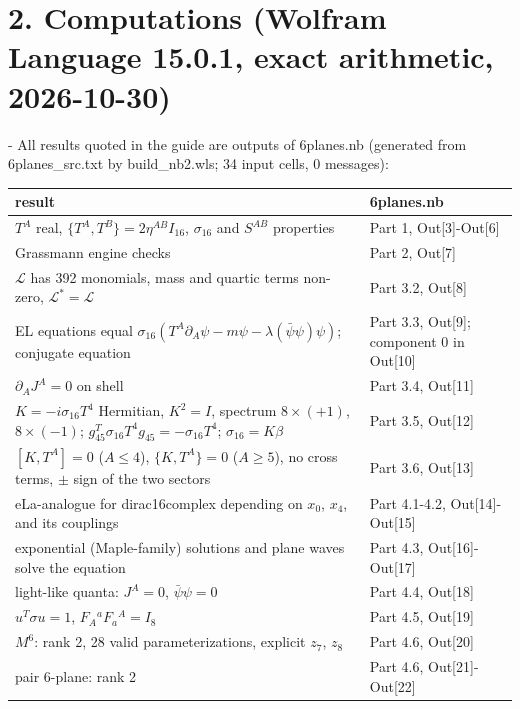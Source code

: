 \documentclass[10pt]{article}
\makeatletter
\newcommand\keepnext{\par\nopagebreak\@nobreaktrue\everypar{\@nobreakfalse\everypar{}}}
\newcommand\mdneed[1]{\par\if@nobreak\else\begingroup\setlength{\dimen@}{#1}\dimen@ii\pagegoal\advance\dimen@ii-\pagetotal
  \ifdim\dimen@>\dimen@ii\ifdim\dimen@ii>\z@\vfil\fi\break\fi\endgroup\fi}
\makeatother
\begin{document}
\section*{2. Computations (Wolfram Language 15.0.1, exact arithmetic, 2026-10-30)}

\mdneed{6.5\baselineskip}All results quoted in the guide are outputs of 6planes.nb (generated from 6planes\_src.txt by build\_nb2.wls; 34 input cells, 0 messages):\keepnext


{\small\begin{longtable}{>{\raggedright\arraybackslash}p{}>{\raggedright\arraybackslash}p{}}\toprule
result & 6planes.nb \\\midrule\endhead
\bottomrule\endfoot
$T^A$ real, $\{T^A,T^B\}=2\eta^{AB}I_{16}$, $\sigma_{16}$ and $S^{AB}$ properties & Part 1, Out[3]-Out[6] \\
Grassmann engine checks & Part 2, Out[7] \\
$\mathcal L$ has 392 monomials, mass and quartic terms non-zero, $\mathcal L^*=\mathcal L$ & Part 3.2, Out[8] \\
EL equations equal $\sigma_{16}(T^A\partial_A\psi - m\psi - \lambda(\bar\psi\psi)\psi)$; conjugate equation & Part 3.3, Out[9]; component 0 in Out[10] \\
$\partial_AJ^A = 0$ on shell & Part 3.4, Out[11] \\
$K = -i\sigma_{16}T^4$ Hermitian, $K^2 = I$, spectrum $8\times(+1)$, $8\times(-1)$; $g_{45}^T\sigma_{16}T^4g_{45} = -\sigma_{16}T^4$; $\sigma_{16}=K\beta$ & Part 3.5, Out[12] \\
$[K,T^A]=0$ ($A\le4$), $\{K,T^A\}=0$ ($A\ge5$), no cross terms, $\pm$ sign of the two sectors & Part 3.6, Out[13] \\
eLa-analogue for dirac16complex depending on $x_0$, $x_4$, and its couplings & Part 4.1-4.2, Out[14]-Out[15] \\
exponential (Maple-family) solutions and plane waves solve the equation & Part 4.3, Out[16]-Out[17] \\
light-like quanta: $J^A = 0$, $\bar\psi\psi = 0$ & Part 4.4, Out[18] \\
$u^T\sigma u = 1$, $F_A{}^aF_a{}^A = I_8$ & Part 4.5, Out[19] \\
$M^6$: rank 2, 28 valid parameterizations, explicit $z_7$, $z_8$ & Part 4.6, Out[20] \\
pair 6-plane: rank 2 & Part 4.6, Out[21]-Out[22] \\
\end{longtable}}
\end{document}
